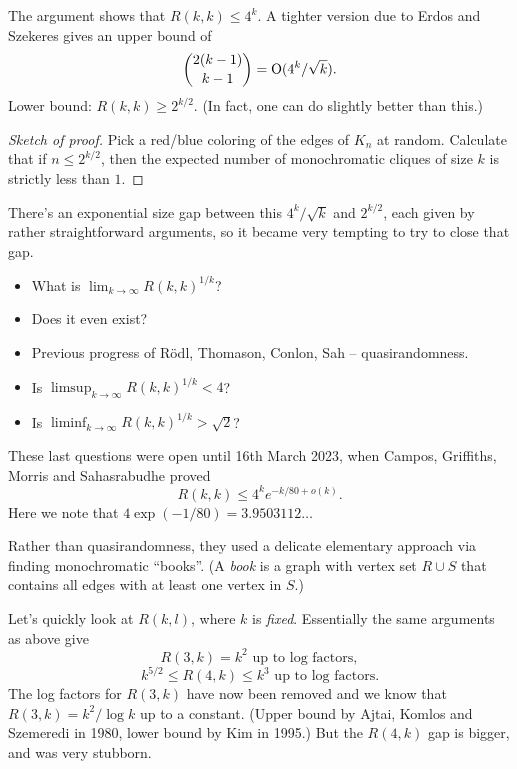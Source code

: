 \documentclass[reqno]{amsart} 
\begin{document}
The argument shows that $R(k, k) \leq 4^k$.  A tighter version due to Erdos and Szekeres gives an upper bound of
\begin{equation*}
  \binom{2(k - 1)}{ k - 1} = \operatorname{O}(4^k / \sqrt{k}).
\end{equation*}
Lower bound: $R(k, k) \geq 2^{k /2}$.  (In fact, one can do slightly better than this.)

\begin{proof}[Sketch of proof]
  Pick a red/blue coloring of the edges of $K_n$ at random.  Calculate that if $n \leq 2^{k/2}$, then the expected number of monochromatic cliques of size $k$ is strictly less than $1$.
\end{proof}

There's an exponential size gap between this $4^k / \sqrt{k}$ and $2^{k /2}$, each given by rather straightforward arguments, so it became very tempting to try to close that gap.
\begin{itemize}
\item What is $\lim_{k \rightarrow \infty} R(k, k)^{1/k}$?
\item Does it even exist?
\item Previous progress of R{\"o}dl, Thomason, Conlon, Sah -- quasirandomness.
\item Is $\limsup_{k \rightarrow \infty} R(k, k)^{1/k} < 4$?
\item Is $\liminf_{k \rightarrow \infty} R(k, k)^{1/k} > \sqrt{2}$?
\end{itemize}
These last questions were open until 16th March 2023, when Campos, Griffiths, Morris and Sahasrabudhe proved
\begin{equation*}
  R(k, k) \leq 4^k e^{- k / 80 + o(k)}.
\end{equation*}
Here we note that $4 \exp(-1/80) = 3.9503112 \dotsc$

Rather than quasirandomness, they used a delicate elementary approach via finding monochromatic ``books''.  (A \emph{book} is a graph with vertex set $R \cup S$ that contains all edges with at least one vertex in $S$.)

Let's quickly look at $R(k, l)$, where $k$ is \emph{fixed}.  Essentially the same arguments as above give
\begin{equation*}
  R(3, k) = k^2 \text{ up to log factors},
\end{equation*}
\begin{equation*}
  k^{5/2} \leq R(4, k) \leq k^3 \text{ up to log factors.}
\end{equation*}
The log factors for $R(3, k)$ have now been removed and we know that $R(3, k) = k^2 / \log k$ up to a constant.  (Upper bound by Ajtai, Komlos and Szemeredi in 1980, lower bound by Kim in 1995.)  But the $R(4, k)$ gap is bigger, and was very stubborn.
\end{document}

